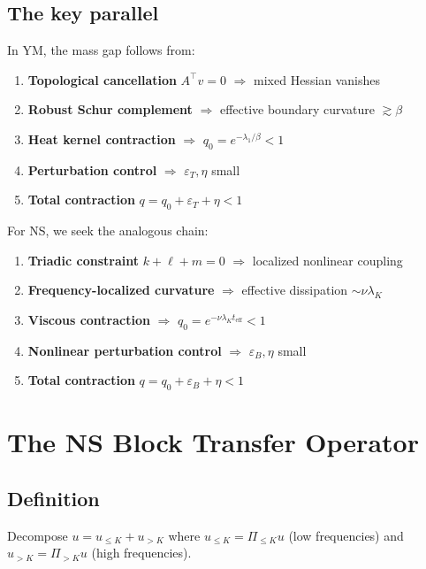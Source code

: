 \documentclass[11pt]{article}
\theoremstyle{definition}
\begin{document}
\subsection{The key parallel}

In YM, the mass gap follows from:
\begin{enumerate}
\item \textbf{Topological cancellation} $A^\top v = 0$ $\Rightarrow$ mixed Hessian vanishes
\item \textbf{Robust Schur complement} $\Rightarrow$ effective boundary curvature $\gtrsim \beta$
\item \textbf{Heat kernel contraction} $\Rightarrow$ $q_0 = e^{-\lambda_1/\beta} < 1$
\item \textbf{Perturbation control} $\Rightarrow$ $\varepsilon_T, \eta$ small
\item \textbf{Total contraction} $q = q_0 + \varepsilon_T + \eta < 1$
\end{enumerate}

For NS, we seek the analogous chain:
\begin{enumerate}
\item \textbf{Triadic constraint} $k + \ell + m = 0$ $\Rightarrow$ localized nonlinear coupling
\item \textbf{Frequency-localized curvature} $\Rightarrow$ effective dissipation $\sim \nu\lambda_K$
\item \textbf{Viscous contraction} $\Rightarrow$ $q_0 = e^{-\nu\lambda_K t_{\mathrm{eff}}} < 1$
\item \textbf{Nonlinear perturbation control} $\Rightarrow$ $\varepsilon_B, \eta$ small
\item \textbf{Total contraction} $q = q_0 + \varepsilon_B + \eta < 1$
\end{enumerate}

\section{The NS Block Transfer Operator}

\subsection{Definition}

Decompose $u = u_{\leq K} + u_{>K}$ where $u_{\leq K} = \Pi_{\leq K} u$ (low frequencies) 
and $u_{>K} = \Pi_{>K} u$ (high frequencies).
\end{document}
